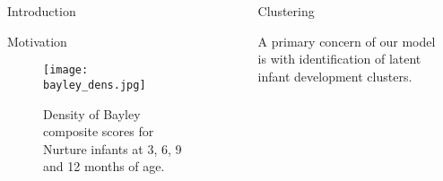 \documentclass[final]{beamer}
\newlength{\sepwid}
\newlength{\onecolwid}
\newlength{\twocolwid}
\begin{document}
\begin{frame}[t]
\begin{columns}[t]
\begin{column}{\onecolwid}
\begin{block}{Introduction}
\end{block}


\begin{block}{Motivation}
\begin{figure}
\texttt{[image: bayley\_dens.jpg]}
\caption{Density of Bayley composite scores for Nurture infants at 3, 6, 9 and 12 months of age.}
\end{figure}
\end{block}


\end{column} %

\begin{column}{\sepwid}\end{column} %

\begin{column}{\twocolwid} %

\begin{columns}[t,totalwidth=\twocolwid] %

\begin{column}{\onecolwid}\vspace{-.6in} %

%	

\begin{block}{Clustering}

A primary concern of our model is with identification of latent infant development clusters. 

\end{block}


\end{column} %

\begin{column}{\onecolwid}\vspace{-.6in} %



\end{column}
\end{columns}
\end{column}
\end{columns}
\end{frame}
\end{document}
